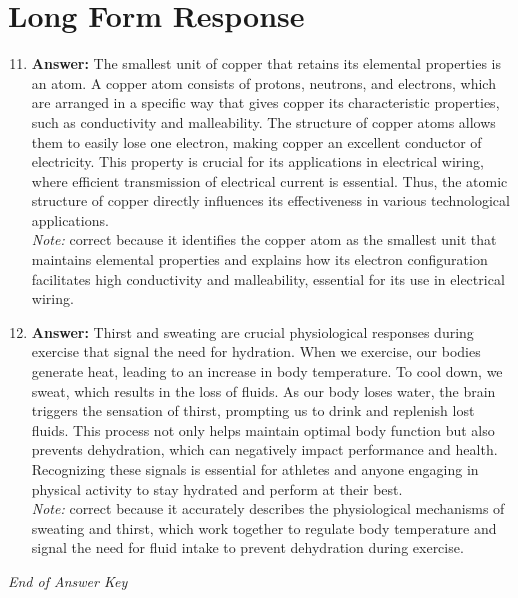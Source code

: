 \documentclass[12pt]{article}
\begin{document}
\section*{Long Form Response}
\begin{enumerate}[label=\arabic*.]
\setcounter{enumi}{10}
\item \textbf{Answer:} The smallest unit of copper that retains its elemental properties is an atom. A copper atom consists of protons, neutrons, and electrons, which are arranged in a specific way that gives copper its characteristic properties, such as conductivity and malleability. The structure of copper atoms allows them to easily lose one electron, making copper an excellent conductor of electricity. This property is crucial for its applications in electrical wiring, where efficient transmission of electrical current is essential. Thus, the atomic structure of copper directly influences its effectiveness in various technological applications.
\\ \textit{Note:} correct because it identifies the copper atom as the smallest unit that maintains elemental properties and explains how its electron configuration facilitates high conductivity and malleability, essential for its use in electrical wiring.
\item \textbf{Answer:} Thirst and sweating are crucial physiological responses during exercise that signal the need for hydration. When we exercise, our bodies generate heat, leading to an increase in body temperature. To cool down, we sweat, which results in the loss of fluids. As our body loses water, the brain triggers the sensation of thirst, prompting us to drink and replenish lost fluids. This process not only helps maintain optimal body function but also prevents dehydration, which can negatively impact performance and health. Recognizing these signals is essential for athletes and anyone engaging in physical activity to stay hydrated and perform at their best.
\\ \textit{Note:} correct because it accurately describes the physiological mechanisms of sweating and thirst, which work together to regulate body temperature and signal the need for fluid intake to prevent dehydration during exercise.
\end{enumerate}

\vfill
\noindent\textit{End of Answer Key}
\end{document}
